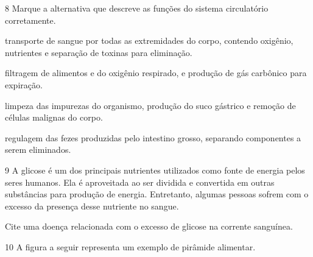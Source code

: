 \pagebreak
\num{8} Marque a alternativa que descreve as funções do sistema circulatório corretamente.

\begin{escolha}
\item transporte de sangue por todas as extremidades do corpo, contendo
oxigênio, nutrientes e separação de toxinas para eliminação.

\item filtragem de alimentos e do oxigênio respirado, e produção de gás
carbônico para expiração.

\item limpeza das impurezas do organismo, produção do suco gástrico e
remoção de células malignas do corpo.

\item regulagem das fezes produzidas pelo intestino grosso, separando
componentes a serem eliminados.
\end{escolha}


\num{9} A glicose é um dos principais nutrientes utilizados como
fonte de energia pelos seres humanos. Ela é aproveitada ao ser dividida
e convertida em outras substâncias para produção de energia. Entretanto,
algumas pessoas sofrem com o excesso da presença desse nutriente no
sangue.

Cite uma doença relacionada com o excesso de glicose na corrente
sanguínea.


\pagebreak
\num{10} A figura a seguir representa um exemplo de pirâmide
alimentar.

